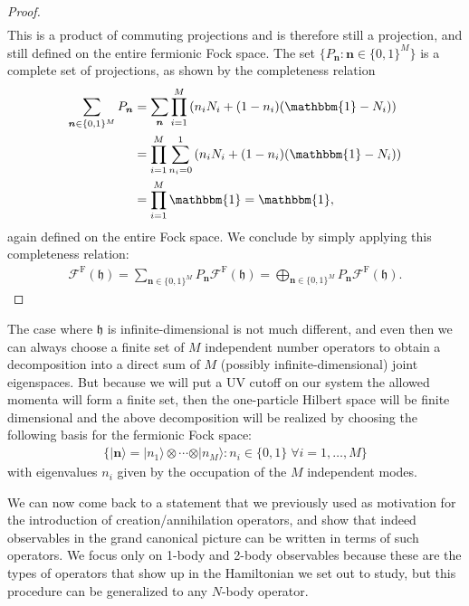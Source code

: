 \begin{proof}
\begin{align*}
	\end{align*}
	This is a product of commuting projections and is therefore still a projection, and still
	defined on the entire fermionic Fock space. The set
	$\{P_{\boldsymbol{n}} : \boldsymbol{n}\in\{0,1\}^M\}$ is a complete set of projections, as
	shown by the completeness relation
	\begin{align*}
		\sum_{\boldsymbol{n}\in\{0,1\}^M} P_{\boldsymbol{n}}
		&= \sum_{\boldsymbol{n}} \prod_{i=1}^M \left(n_iN_i+(1-n_i)(\mathbbm{1}-N_i)\right)\\
		&= \prod_{i=1}^M \sum_{n_i=0}^1\left(n_iN_i+(1-n_i)(\mathbbm{1}-N_i)\right)\\
		&= \prod_{i=1}^M \mathbbm{1} = \mathbbm{1},
	\end{align*}
	again defined on the entire Fock space. We conclude by simply applying this completeness
	relation:
	\begin{align*}
		\mathcal{F}^{\mathrm{F}}(\mathfrak{h}) = \sum_{\boldsymbol{n}\in\{0,1\}^M}
		P_{\boldsymbol{n}}\mathcal{F}^{\mathrm{F}}(\mathfrak{h})
		= \bigoplus_{\boldsymbol{n}\in\{0,1\}^M}P_{\boldsymbol{n}}\mathcal{F}^{\mathrm{F}}(\mathfrak{h}).
	\end{align*}
\end{proof}

\begin{remark}
	The case where $\mathfrak{h}$ is infinite-dimensional is not much different, and even then
	we can always choose a finite set of $M$ independent number operators to obtain a
	decomposition into a direct sum of $M$ (possibly infinite-dimensional) joint eigenspaces.
	But because we will put a UV cutoff on our system the allowed momenta will form a finite
	set, then the one-particle Hilbert space will be finite dimensional and the above
	decomposition will be realized by choosing the following basis for the fermionic Fock space:
	\begin{align*}
		\{\vert\boldsymbol{n}\rangle = \vert n_1\rangle\otimes\cdots\otimes\vert n_M\rangle
		:n_i\in\{0,1\}\;\forall i=1,\ldots,M\}
	\end{align*}
	with eigenvalues $n_i$ given by the occupation of the $M$ independent modes.
\end{remark}

We can now come back to a statement that we previously used as motivation for the introduction
of creation/annihilation operators, and show that indeed observables in the grand
canonical picture can be written in terms of such operators. We focus only on 1-body and 2-body
observables because these are the types of operators that show up in the Hamiltonian we set
out to study, but this procedure can be generalized to any $N$-body operator.


